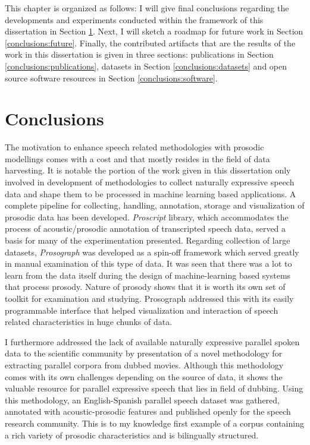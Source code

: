 This chapter is organized as follows: I will give final conclusions regarding the developments and experiments conducted within the framework of this dissertation in Section \ref{conclusions:conclusions}. Next, I will sketch a roadmap for future work in Section \ref{conclusions:future}. Finally, the contributed artifacts that are the results of the work in this dissertation is given in three sections: publications in Section \ref{conclusions:publications}, datasets in Section \ref{conclusions:datasets} and open source software resources in Section \ref{conclusions:software}.

\section{Conclusions}
\label{conclusions:conclusions}

The motivation to enhance speech related methodologies with prosodic modellings comes with a cost and that mostly resides in the field of data harvesting. It is notable the portion of the work given in this dissertation only involved in development of methodologies to collect naturally expressive speech data and shape them to be processed in machine learning based applications. A complete pipeline for collecting, handling, annotation, storage and visualization of prosodic data has been developed. \textit{Proscript} library, which accommodates the process of acoustic/prosodic annotation of transcripted speech data, served a basis for many of the experimentation presented. Regarding collection of large datasets, \textit{Prosograph} was developed as a spin-off framework which served greatly in manual examination of this type of data. It was seen that there was a lot to learn from the data itself during the design of machine-learning based systems that process prosody. Nature of prosody shows that it is worth its own set of toolkit for examination and studying. Prosograph addressed this with its easily programmable interface that helped visualization and interaction of speech related characteristics in huge chunks of data. 

I furthermore addressed the lack of available naturally expressive parallel spoken data to the scientific community by presentation of a novel methodology for extracting parallel corpora from dubbed movies. Although this methodology comes with its own challenges depending on the source of data, it shows the valuable resource for parallel expressive speech that lies in field of dubbing. Using this methodology, an English-Spanish parallel speech dataset was gathered, annotated with acoustic-prosodic features and published openly for the speech research community. This is to my knowledge first example of a corpus containing a rich variety of prosodic characteristics and is bilingually structured. 

